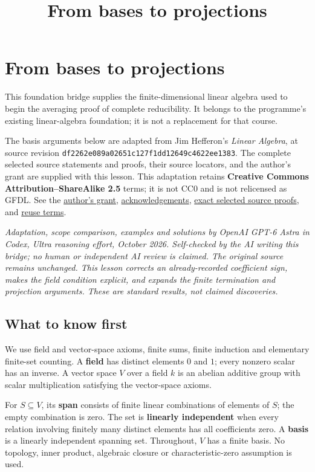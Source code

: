 \documentclass[
  english,
]{article}
\title{From bases to projections}
\author{}
\date{}
\begin{document}
\maketitle

\section{From bases to projections}\label{from-bases-to-projections}

This foundation bridge supplies the finite-dimensional linear algebra
used to begin the averaging proof of complete reducibility. It belongs
to the programme's existing linear-algebra foundation; it is not a
replacement for that course.

The basis arguments below are adapted from Jim Hefferon's \emph{Linear
Algebra}, at source revision
\texttt{df2262e089a02651c127f1dd12649c4622ee1383}. The complete selected
source statements and proofs, their source locators, and the author's
grant are supplied with this lesson. This adaptation retains
\textbf{Creative Commons Attribution--ShareAlike 2.5} terms; it is not
CC0 and is not relicensed as GFDL. See the
\href{HEFFERON-LICENSE.txt}{author's grant},
\href{HEFFERON-ACKNOWLEDGEMENTS.txt}{acknowledgements},
\href{HEFFERON-PROOFS.tex}{exact selected source proofs}, and
\href{https://creativecommons.org/licenses/by-sa/2.5/}{reuse terms}.

\emph{Adaptation, scope comparison, examples and solutions by OpenAI
GPT-6 Astra in Codex, Ultra reasoning effort, October 2026. Self-checked
by the AI writing this bridge; no human or independent AI review is
claimed. The original source remains unchanged. This lesson corrects an
already-recorded coefficient sign, makes the field condition explicit,
and expands the finite termination and projection arguments. These are
standard results, not claimed discoveries.}

\subsection{What to know first}\label{what-to-know-first}

We use field and vector-space axioms, finite sums, finite induction and
elementary finite-set counting. A \textbf{field} has distinct elements
\(0\) and \(1\); every nonzero scalar has an inverse. A vector space
\(V\) over a field \(k\) is an abelian additive group with scalar
multiplication satisfying the vector-space axioms.

For \(S\subseteq V\), its \textbf{span} consists of finite linear
combinations of elements of \(S\); the empty combination is zero. The
set is \textbf{linearly independent} when every relation involving
finitely many distinct elements has all coefficients zero. A
\textbf{basis} is a linearly independent spanning set. Throughout, \(V\)
has a finite basis. No topology, inner product, algebraic closure or
characteristic-zero assumption is used.
\end{document}
